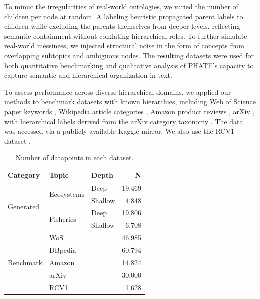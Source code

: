 To mimic the irregularities of real-world ontologies, we varied the number of children per node at random. A labeling heuristic propagated parent labels to children while excluding the parents themselves from deeper levels, reflecting semantic containment without conflating hierarchical roles. To further simulate real-world messiness, we injected structural noise in the form of concepts from overlapping subtopics and ambiguous nodes. 
The resulting datasets were used for both quantitative benchmarking and qualitative analysis of PHATE’s capacity to capture semantic and hierarchical organization in text.

To assess performance across diverse hierarchical domains, we applied our methods to benchmark datasets with known hierarchies, including Web of Science paper keywords \cite{kowsari2017HDLTex}, Wikipedia article categories \cite{brummer2016dbpedia, NIPS2015_250cf8b5, yang2019xlnet}, Amazon product reviews \cite{yury_kashnitsky_2020}, arXiv \cite{arxiv_kaggle}, with hierarchical labels derived from the arXiv category taxonomy \cite{arxiv_taxonomy}. The data was accessed via a publicly available Kaggle mirror. We also use the RCV1 dataset \cite{lewis2004rcv1}.

\begin{table}[ht]
    \centering
    \caption{Number of datapoints in each dataset.}
    \begin{tabular}{l l l r}
    \hline
    \textbf{Category} & \textbf{Topic} & \textbf{Depth} & \textbf{N} \\
    \hline
    \multirow{4}{*}{Generated} 
     & \multirow{2}{*}{Ecosystems} & Deep & 19{,}469 \\
     &  & Shallow & 4{,}848 \\
     & \multirow{2}{*}{Fisheries} & Deep & 19{,}806 \\
     &  & Shallow & 6{,}708 \\
    \hline
    \multirow{5}{*}{Benchmark}
     & \multicolumn{2}{l}{WoS} & 46{,}985 \\
     & \multicolumn{2}{l}{DBpedia} & 60{,}794 \\
     & \multicolumn{2}{l}{Amazon} & 14{,}824 \\
     & \multicolumn{2}{l}{arXiv} & 30{,}000 \\
     & \multicolumn{2}{l}{RCV1} & 1{,}628 \\
    \hline
    \end{tabular}
    \label{tab:dataset_counts}
    \end{table}